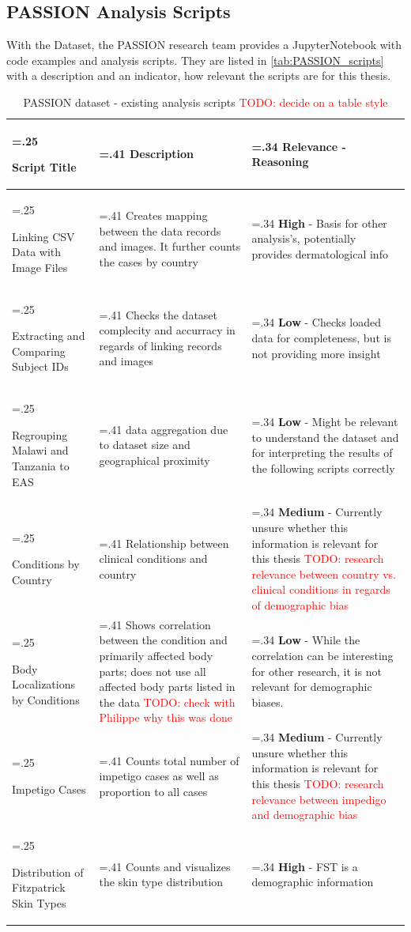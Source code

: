 \documentclass[12pt, a4paper, oneside]{book}   	%
\renewcommand{\todo}[1]{\textcolor{red}{TODO: #1}}
\begin{document}
			\subsection{PASSION Analysis Scripts}
				With the Dataset, the PASSION research team provides a \gls{JupyterNotebook} with code examples and analysis scripts. They are listed in \autoref{tab:PASSION_scripts} with a description and an indicator, how relevant the scripts are for this thesis.
				\begin{table}[H]
					\centering
					\begin{tabularx}{\textwidth}{>{\hsize=.25\hsize\raggedright}X>{\hsize=.41\hsize}X>{\hsize=.34\hsize}X}
						\toprule
						\textbf{Script Title}       & \textbf{Description} & \textbf{Relevance - Reasoning}       \\ \midrule
						Linking CSV Data with Image Files & 
						Creates mapping between the data records and images. It further counts the cases by country  &
						\textbf{High} - Basis for other analysis's, potentially provides dermatological info        \\
						\hline
						Extracting and Comparing Subject IDs &
						Checks the dataset complecity and accurracy in regards of linking records and images &
						\textbf{Low} - Checks loaded data for completeness, but is not providing more insight   \\
						\hline
						Regrouping Malawi and Tanzania to EAS &
						data aggregation due to dataset size and geographical proximity &
						\textbf{Low} - Might be relevant to understand the dataset and for interpreting the results of the following scripts correctly  \\
						\hline
						Conditions by Country &
						Relationship between clinical conditions and country &
						\textbf{Medium} - Currently unsure whether this information is relevant for this thesis \todo{research relevance between country vs. clinical conditions in regards of demographic bias} \\
						\hline
						Body Localizations by Conditions &
						Shows correlation between the condition and primarily affected body parts; does not use all affected body parts listed in the data \todo{check with Philippe why this was done} &
						\textbf{Low} - While the correlation can be interesting for other research, it is not relevant for demographic biases. \\
						\hline
						Impetigo Cases            &
						Counts total number of impetigo cases as well as proportion to all cases &
						\textbf{Medium} - Currently unsure whether this information is relevant for this thesis \todo{research relevance between impedigo and demographic bias} \\
						\hline
						Distribution of Fitzpatrick Skin Types &
						Counts and visualizes the skin type distribution  &
						\textbf{High} - \gls{FST} is a demographic information   \\
						\bottomrule
					\end{tabularx}
					\caption{PASSION dataset - existing analysis scripts \autocite{Gottfrois2024} \todo{decide on a table style}}
					\label{tab:PASSION_scripts}
				\end{table}	
				
\end{document}
